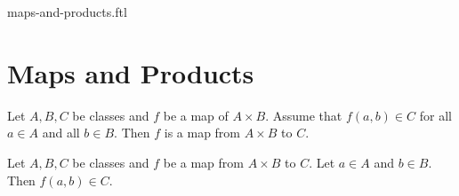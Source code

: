 \documentclass{naproche-library}
\begin{document}
\begin{smodule}{maps-and-products.ftl}

  \section*{Maps and Products}

  \begin{proposition}[forthel,id=FOUNDATIONS_06_2754759509409792,printid]
    Let $A, B, C$ be classes and $f$ be a map of $A \times B$.
    Assume that $f(a,b) \in C$ for all $a \in A$ and all $b \in B$.
    Then $f$ is a map from $A \times B$ to $C$.
  \end{proposition}

  \begin{proposition}[forthel,id=FOUNDATIONS_06_2304295212941312,printid]
    Let $A, B, C$ be classes and $f$ be a map from $A \times B$ to $C$.
    Let $a \in A$ and $b \in B$.
    Then $f(a,b) \in C$.
  \end{proposition}
\end{smodule}
\end{document}
